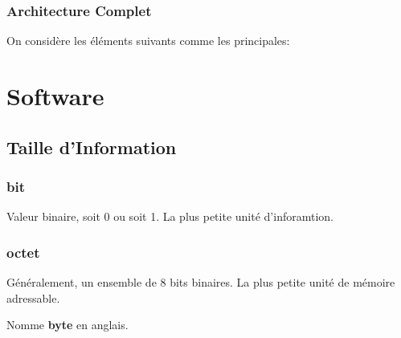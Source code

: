 \documentclass{article}
\begin{document}
\subsubsection{Architecture Complet}
\begin{definition}\label{def:architectureComplet}
    On considère les éléments suivants comme les principales:
    \begin{figure}[H]
        \centering
    \end{figure}
\end{definition}



\section{Software}


\subsection{Taille d'Information}
\subsubsection{bit}
\begin{definition}\label{def:bit}
    Valeur binaire, soit 0 ou soit 1. La plus petite unité d'inforamtion.
\end{definition}

\subsubsection{octet}
\begin{definition}\label{def:octet}
    Généralement, un ensemble de 8 bits binaires. La plus petite unité de mémoire adressable.
    
    \begin{remark}
        Nomme \textbf{byte} en anglais.
    \end{remark}
\end{definition}
\end{document}
